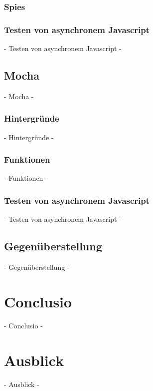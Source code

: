 
\subsubsection{Spies}

\subsubsection{Testen von asynchronem Javascript}
 - Testen von asynchronem Javascript -

\subsection{Mocha}
 - Mocha -

\subsubsection{Hintergründe}
 - Hintergründe -
\subsubsection{Funktionen}
 - Funktionen -
\subsubsection{Testen von asynchronem Javascript}
 - Testen von asynchronem Javascript -

\subsection{Gegenüberstellung}
 - Gegenüberstellung -
\newpage
\section{Conclusio}
 - Conclusio -

\newpage
\section{Ausblick}
 - Ausblick -

\nocite{Green:2013}
\nocite{Kozlowski:2013}
\nocite{Zakas:2012}
\nocite{MacCaw:2011}
\nocite{Burnham:2011}
\nocite{Gaertner:2012}
